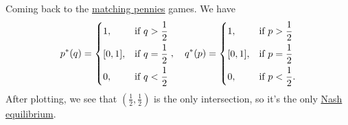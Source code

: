 \begin{eg}
	Coming back to the \hyperref[eg:matching-pennies]{matching pennies} games. We have
	\[
		p^{\ast}(q) = \begin{dcases}
			1,      & \text{if } q > \frac{1}{2} \\
			[0, 1], & \text{if } q = \frac{1}{2} \\
			0,      & \text{if } q < \frac{1}{2}
		\end{dcases}, \quad q^{\ast}(p) = \begin{dcases}
			1,      & \text{if } p > \frac{1}{2}  \\
			[0, 1], & \text{if } p = \frac{1}{2}  \\
			0,      & \text{if } p < \frac{1}{2}.
		\end{dcases}
	\]
	After plotting, we see that \((\frac{1}{2}, \frac{1}{2})\) is the only intersection, so it's the only \hyperref[def:Nash-equilibrium]{Nash equilibrium}.
	\begin{center}
	\end{center}
\end{eg}

